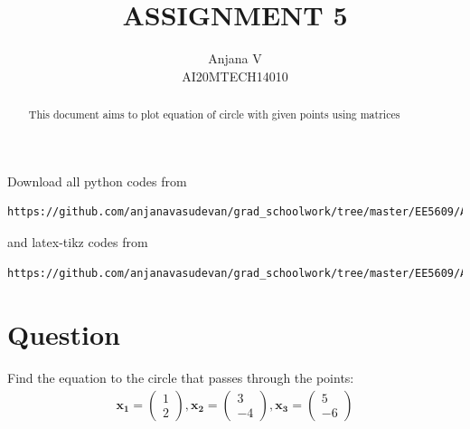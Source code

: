 \documentclass[journal,12pt,twocolumn]{IEEEtran}
\title{ASSIGNMENT 5}
\author{Anjana V\\AI20MTECH14010 }
\begin{document}
\newcommand{\myvec}[1]{\ensuremath{\begin{pmatrix}#1\end{pmatrix}}}
\newcommand{\mydet}[1]{\ensuremath{\begin{vNiceMatrix}[small]#1\end{vNiceMatrix}}}
\renewcommand{\vec}[1]{\mathbf{#1}}
\newcommand{\BAR}{%
  \hspace{-\arraycolsep}%
  \strut\vrule %
  \hspace{-\arraycolsep}%
}
\maketitle
\begin{abstract}
This document aims to plot equation of circle with given points using matrices
\end{abstract}
Download all python codes from
%
\begin{lstlisting}
https://github.com/anjanavasudevan/grad_schoolwork/tree/master/EE5609/Assignment5/Code
\end{lstlisting}
%
and latex-tikz codes from
%
\begin{lstlisting}
https://github.com/anjanavasudevan/grad_schoolwork/tree/master/EE5609/Assignment5/Latex
\end{lstlisting}
%
\section{Question}
Find the equation to the circle that passes through the points:
\begin{align}
\vec{x_1} = \myvec{1\\2},\vec{x_2} = \myvec{3\\-4} , \vec{x_3} = \myvec{5\\-6}
\end{align}
\end{document}
